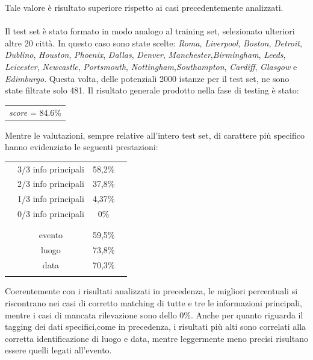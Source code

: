 \documentclass[a4paper]{report}
\begin{document}
Tale valore è risultato superiore rispetto ai casi precedentemente analizzati. \\ \\
Il test set è stato formato in modo analogo al training set, selezionato ulteriori altre 20 città. In questo caso sono state scelte: \textit{Roma}, \textit{Liverpool}, \textit{Boston}, \textit{Detroit}, \textit{Dublino}, \textit{Houston}, \textit{Phoenix}, \textit{Dallas}, \textit{Denver}, \textit{Manchester},\textit{Birmingham}, \textit{Leeds}, \textit{Leicester}, \textit{Newcastle}, \textit{Portsmouth}, \textit{Nottingham},\textit{Southampton}, \textit{Cardiff}, \textit{Glasgow} e \textit{Edimburgo}. Questa volta, delle potenziali 2000 istanze per il test set, ne sono state filtrate solo 481.  Il risultato generale prodotto nella fase di testing è stato: 
\begin{center}
\begin{tabular}{c}
\textit{score} = 84.6\%\\
\end{tabular}
\end{center}
Mentre le valutazioni, sempre relative all'intero test set, di carattere più specifico hanno evidenziato le seguenti prestazioni:
\begin{center}
\begin{tabular}{cccc}
& & & \\
\hline
& 3/3 info principali & 58,2\% &\\
& 2/3 info principali & 37,8\% &\\ 
& 1/3 info principali & 4,37\% &\\ 
& 0/3 info principali & 0\% &\\ 
\hline
& & & \\
& & & \\
\hline
& evento & 59,5\% &\\
& luogo & 73,8\% &\\
& data & 70,3\% &\\
\hline
& & & \\
\end{tabular}
\end{center}
Coerentemente con i risultati analizzati in precedenza, le migliori percentuali si riscontrano nei casi di corretto matching di tutte e tre le informazioni principali, mentre i casi di mancata rilevazione sono dello 0\%. Anche per quanto riguarda il tagging dei dati specifici,come in precedenza, i risultati più alti sono correlati alla corretta identificazione di luogo e data, mentre leggermente meno precisi risultano essere quelli legati all'evento.
\end{document}
